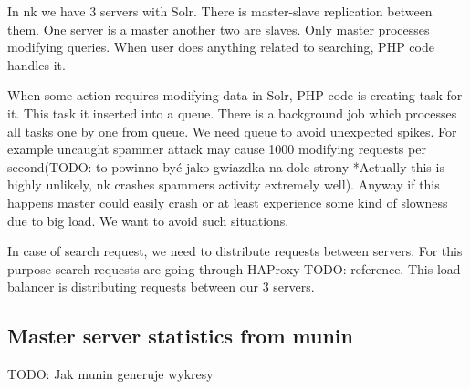 \documentclass[10pt,a4paper]{article}
\newcommand{\todo}[1]{\noindent\colorbox{myRed}{TODO: #1}}
\begin{document}
In nk we have 3 servers with Solr. There is master-slave replication between them. One server is a master another two are slaves. Only master processes modifying queries. When user does anything related to searching, PHP code handles it.

When some action requires modifying data in Solr, PHP code is creating task for it. This task it inserted into a queue. There is a background job which processes all tasks one by one from queue. We need queue to avoid unexpected spikes. For example uncaught spammer attack may cause 1000 modifying requests per second(\todo{to powinno być jako gwiazdka na dole strony} *Actually this is highly unlikely, nk crashes spammers activity extremely well). Anyway if this happens master could easily crash or at least experience some kind of slowness due to big load. We want to avoid such situations. 

In case of search request, we need to distribute requests between servers. For this purpose search requests are going through HAProxy \todo{reference}. This load balancer is distributing requests between our 3 servers.

\subsection{Master server statistics from munin}

\todo{Jak munin generuje wykresy}
\end{document}
